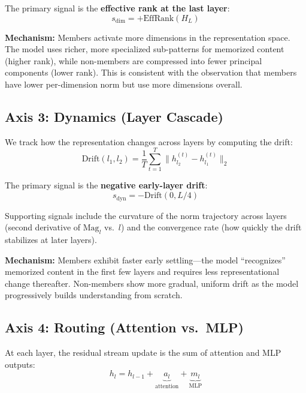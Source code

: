\documentclass[11pt]{article}
\begin{document}
The primary signal is the \textbf{effective rank at the last layer}:
\begin{equation}
    s_{\text{dim}} = +\text{EffRank}(H_L)
\end{equation}

\textbf{Mechanism:} Members activate more dimensions in the representation space.
The model uses richer, more specialized sub-patterns for memorized content (higher rank), while non-members are compressed into fewer principal components (lower rank).
This is consistent with the observation that members have lower per-dimension norm but use more dimensions overall.

\subsection{Axis 3: Dynamics (Layer Cascade)}
\label{sec:dynamics}

We track how the representation changes across layers by computing the drift:
\begin{equation}
    \text{Drift}(l_1, l_2) = \frac{1}{T} \sum_{t=1}^T \|h_{l_2}^{(t)} - h_{l_1}^{(t)}\|_2
\end{equation}

The primary signal is the \textbf{negative early-layer drift}:
\begin{equation}
    s_{\text{dyn}} = -\text{Drift}(0, L/4)
\end{equation}

Supporting signals include the curvature of the norm trajectory across layers (second derivative of $\text{Mag}_l$ vs.\ $l$) and the convergence rate (how quickly the drift stabilizes at later layers).

\textbf{Mechanism:} Members exhibit faster early settling---the model ``recognizes'' memorized content in the first few layers and requires less representational change thereafter.
Non-members show more gradual, uniform drift as the model progressively builds understanding from scratch.

\subsection{Axis 4: Routing (Attention vs.\ MLP)}
\label{sec:routing}

At each layer, the residual stream update is the sum of attention and MLP outputs:
\begin{equation}
    h_l = h_{l-1} + \underbrace{a_l}_{\text{attention}} + \underbrace{m_l}_{\text{MLP}}
\end{equation}
\end{document}
